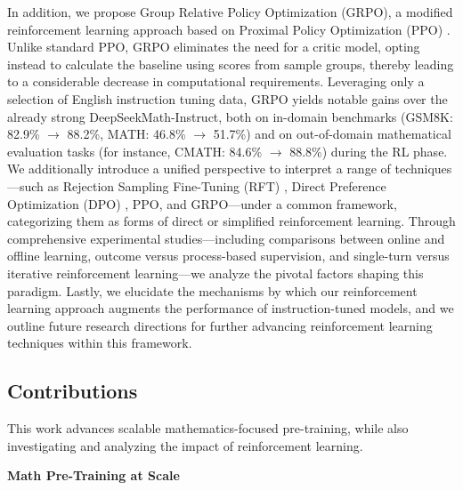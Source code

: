 In addition, we propose Group Relative Policy Optimization (GRPO), a modified reinforcement learning approach based on Proximal Policy Optimization (PPO) \citep{schulman2017proximal}. Unlike standard PPO, GRPO eliminates the need for a critic model, opting instead to calculate the baseline using scores from sample groups, thereby leading to a considerable decrease in computational requirements. Leveraging only a selection of English instruction tuning data, GRPO yields notable gains over the already strong DeepSeekMath-Instruct, both on in-domain benchmarks (GSM8K: 82.9\% $\rightarrow$ 88.2\%, MATH: 46.8\% $\rightarrow$ 51.7\%) and on out-of-domain mathematical evaluation tasks (for instance, CMATH: 84.6\% $\rightarrow$ 88.8\%) during the RL phase. We additionally introduce a unified perspective to interpret a range of techniques—such as Rejection Sampling Fine-Tuning (RFT) \citep{yuan2023scaling}, Direct Preference Optimization (DPO) \citep{dpo}, PPO, and GRPO—under a common framework, categorizing them as forms of direct or simplified reinforcement learning. Through comprehensive experimental studies—including comparisons between online and offline learning, outcome versus process-based supervision, and single-turn versus iterative reinforcement learning—we analyze the pivotal factors shaping this paradigm. Lastly, we elucidate the mechanisms by which our reinforcement learning approach augments the performance of instruction-tuned models, and we outline future research directions for further advancing reinforcement learning techniques within this framework.

\subsection{Contributions}
This work advances scalable mathematics-focused pre-training, while also investigating and analyzing the impact of reinforcement learning.

\textbf{Math Pre-Training at Scale}


